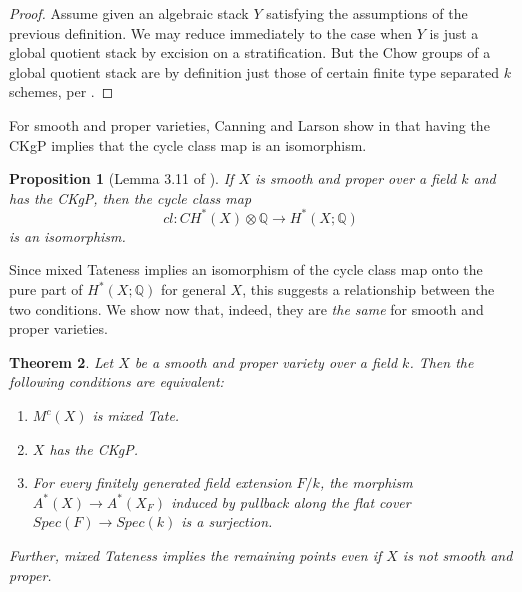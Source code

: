 \documentclass[11pt]{amsart}
\newtheorem{thm}{Theorem}[section]
\newtheorem{prop}[thm]{Proposition}
\theoremstyle{definition}
\theoremstyle{remark}
\numberwithin{equation}{section}
\begin{document}
\begin{proof}
    Assume given an algebraic stack $Y$ satisfying the assumptions of the previous definition.
    We may reduce immediately to the case when $Y$ is just a global quotient stack by excision on a stratification.
    But the Chow groups of a global quotient stack are by definition just those of certain finite type separated $k$ schemes, per \cite{MR1614555}.
\end{proof}

For smooth and proper varieties, Canning and Larson show in \cite{MR5083265} that having the CKgP implies that the cycle class map is an isomorphism.

\begin{prop}[Lemma 3.11 of \cite{MR5083265}]
    If $X$ is smooth and proper over a field $k$ and has the CKgP, then the cycle class map \begin{equation}
        cl: CH^*(X) \otimes \mathbb{Q} \rightarrow H^*(X;\mathbb{Q}) 
    \end{equation}
    \noindent is an isomorphism.
\end{prop}

Since mixed Tateness implies an isomorphism of the cycle class map onto the pure part of $H^*(X;\mathbb{Q})$ for general $X$, this suggests a relationship between the two conditions. We show now that, indeed, they are \textit{the same} for smooth and proper varieties.

\begin{thm}\label{mixed Tate vs. ckgp}
    Let $X$ be a smooth and proper variety over a field $k$. Then the following conditions are equivalent:

    \begin{enumerate}
        \item $M^c(X)$ is mixed Tate.
        \item $X$ has the CKgP.
        \item For every finitely generated field extension $F/k$, the morphism $A^*(X) \rightarrow A^*(X_F)$ induced by pullback along the flat cover $Spec(F) \rightarrow Spec(k)$ is a surjection.
    \end{enumerate}

    Further, mixed Tateness implies the remaining points even if $X$ is not smooth and proper.
\end{thm}
\end{document}
